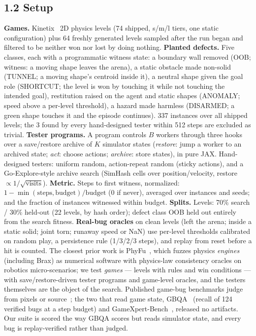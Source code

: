 \subsection*{1.2 Setup}
\textbf{Games.} Kinetix~\cite{kinetix} 2D physics levels (74 shipped, s/m/l tiers, one static configuration) plus 64 freshly
generated levels sampled after the run began and filtered to be neither won nor lost by doing nothing. \textbf{Planted defects.}
Five classes, each with a programmatic witness state: a boundary wall removed (OOB; witness: a moving shape leaves the arena), a
static obstacle made non-solid (TUNNEL; a moving shape's centroid inside it), a neutral shape given the goal role (SHORTCUT;
the level is won by touching it while not touching the intended goal), restitution raised on the agent and static shapes
(ANOMALY; speed above a per-level threshold), a hazard made harmless (DISARMED; a green shape touches it and the episode
continues). 337 instances over all shipped levels; the 3 found by every hand-designed tester within 512 steps are excluded
as trivial. \textbf{Tester programs.} A program controls $B$ workers through three hooks over a save/restore archive of $K$
simulator states (\emph{restore}: jump a worker to an archived state; \emph{act}: choose actions; \emph{archive}: store states),
in pure JAX. Hand-designed testers: uniform random, action-repeat random (sticky actions), and a Go-Explore-style archive
search (SimHash cells over position/velocity, restore $\propto 1/\sqrt{\text{visits}}$). \textbf{Metric.} Steps to first
witness, normalized: $1-\min(\text{steps},\text{budget})/\text{budget}$ (0 if never), averaged over instances and seeds;
and the fraction of instances witnessed within budget. \textbf{Splits.} Levels: 70\% search / 30\% held-out (22 levels, by hash order);
defect class OOB held out entirely from the search fitness. \textbf{Real-bug oracles} on clean levels (left the arena; inside a static solid; joint torn; runaway speed or NaN) use per-level
thresholds calibrated on random play, a persistence rule (1/3/2/3 steps), and replay from reset before a hit is counted. The closest prior work is
PhyFu~\cite{phyfu}, which fuzzes physics \emph{engines} (including Brax) as numerical software with physics-law consistency
oracles on robotics micro-scenarios; we test \emph{games} --- levels with rules and win conditions --- with save/restore-driven
tester programs and game-level oracles, and the testers themselves are the object of the search. Published game-bug benchmarks judge from pixels or source~\cite{videogameqa,videoglitchbench,tempglitch,taesiri22,wob}; the two that
read game state, GBQA~\cite{gbqa} (recall of 124 verified bugs at a step budget) and GameXpert-Bench~\cite{gamexpert}, released no
artifacts. Our suite is scored the way GBQA scores but reads simulator state, and every bug is replay-verified rather than judged.

